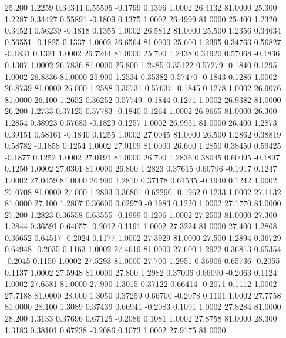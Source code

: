   25.200   1.2259   0.34344   0.55505  -0.1799   0.1396   1.0002  26.4132  81.0000
  25.300   1.2287   0.34427   0.55891  -0.1809   0.1375   1.0002  26.4999  81.0000
  25.400   1.2320   0.34524   0.56239  -0.1818   0.1355   1.0002  26.5812  81.0000
  25.500   1.2356   0.34634   0.56551  -0.1825   0.1337   1.0002  26.6564  81.0000
  25.600   1.2395   0.34763   0.56827  -0.1831   0.1321   1.0002  26.7244  81.0000
  25.700   1.2438   0.34920   0.57068  -0.1836   0.1307   1.0002  26.7836  81.0000
  25.800   1.2485   0.35122   0.57279  -0.1840   0.1295   1.0002  26.8336  81.0000
  25.900   1.2534   0.35382   0.57470  -0.1843   0.1286   1.0002  26.8739  81.0000
  26.000   1.2588   0.35731   0.57637  -0.1845   0.1278   1.0002  26.9076  81.0000
  26.100   1.2652   0.36252   0.57749  -0.1844   0.1271   1.0002  26.9382  81.0000
  26.200   1.2733   0.37125   0.57783  -0.1840   0.1264   1.0002  26.9665  81.0000
  26.300   1.2854   0.38923   0.57683  -0.1829   0.1257   1.0002  26.9951  81.0000
  26.400   1.2873   0.39151   0.58161  -0.1840   0.1255   1.0002  27.0045  81.0000
  26.500   1.2862   0.38819   0.58782  -0.1858   0.1254   1.0002  27.0109  81.0000
  26.600   1.2850   0.38450   0.59425  -0.1877   0.1252   1.0002  27.0191  81.0000
  26.700   1.2836   0.38045   0.60095  -0.1897   0.1250   1.0002  27.0301  81.0000
  26.800   1.2823   0.37615   0.60796  -0.1917   0.1247   1.0002  27.0459  81.0000
  26.900   1.2810   0.37178   0.61535  -0.1940   0.1242   1.0002  27.0708  81.0000
  27.000   1.2803   0.36801   0.62290  -0.1962   0.1233   1.0002  27.1132  81.0000
  27.100   1.2807   0.36600   0.62979  -0.1983   0.1220   1.0002  27.1770  81.0000
  27.200   1.2823   0.36558   0.63555  -0.1999   0.1206   1.0002  27.2503  81.0000
  27.300   1.2844   0.36591   0.64057  -0.2012   0.1191   1.0002  27.3224  81.0000
  27.400   1.2868   0.36652   0.64517  -0.2024   0.1177   1.0002  27.3929  81.0000
  27.500   1.2894   0.36729   0.64948  -0.2035   0.1163   1.0002  27.4619  81.0000
  27.600   1.2922   0.36813   0.65354  -0.2045   0.1150   1.0002  27.5293  81.0000
  27.700   1.2951   0.36906   0.65736  -0.2055   0.1137   1.0002  27.5948  81.0000
  27.800   1.2982   0.37006   0.66090  -0.2063   0.1124   1.0002  27.6581  81.0000
  27.900   1.3015   0.37122   0.66414  -0.2071   0.1112   1.0002  27.7188  81.0000
  28.000   1.3050   0.37259   0.66700  -0.2078   0.1101   1.0002  27.7758  81.0000
  28.100   1.3089   0.37439   0.66941  -0.2083   0.1091   1.0002  27.8284  81.0000
  28.200   1.3133   0.37696   0.67125  -0.2086   0.1081   1.0002  27.8758  81.0000
  28.300   1.3183   0.38101   0.67238  -0.2086   0.1073   1.0002  27.9175  81.0000
